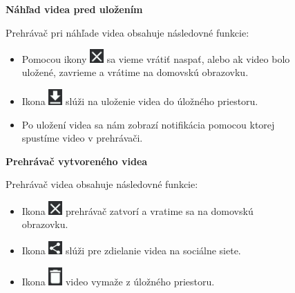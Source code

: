 \documentclass[12pt, oneside]{book}
\begin{document}
\begin{figure}[H]

    \hspace{15pt} \textbf{Náhľad videa pred uložením}

\vspace{10pt}
\hspace{15pt} Prehrávač pri náhľade videa obsahuje následovné funkcie: 
 \begin{itemize}
        \item Pomocou ikony \includegraphics[width=0.05\textwidth]{images/close.png} sa vieme vrátiť naspať, alebo ak video bolo uložené, zavrieme a vrátime na domovskú obrazovku.
        \item Ikona \includegraphics[width=0.05\textwidth]{images/save.png} slúži na uloženie videa do úložného priestoru.
        \item Po uložení videa sa nám zobrazí notifikácia pomocou ktorej spustíme video v prehrávači.
        
    \end{itemize} 
   
\end{figure}

\begin{figure}[H]

    \hspace{15pt} \textbf{Prehrávač vytvoreného videa}
    
    \vspace{10pt}
    
\hspace{15pt} Prehrávač videa obsahuje následovné funkcie: 
 \begin{itemize}
        \item Ikona \includegraphics[width=0.05\textwidth]{images/close.png} prehrávač zatvorí a vratime sa na domovskú obrazovku.
        \item Ikona \includegraphics[width=0.05\textwidth]{images/share.png} slúži pre zdielanie videa na sociálne siete.
        \item Ikona \includegraphics[width=0.05\textwidth]{images/delete.png} video vymaže z úložného priestoru.
        
    \end{itemize} 
   
\end{figure}
\end{document}

